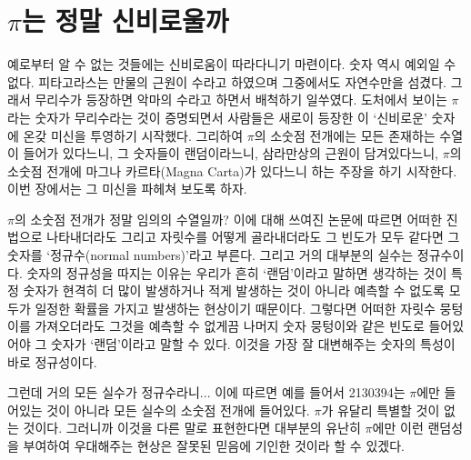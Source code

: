 \documentclass[10pt]{article}
\begin{document}
\section{$\pi$는 정말 신비로울까}
예로부터 알 수 없는 것들에는 신비로움이 따라다니기 마련이다. 숫자 역시 예외일 수 없다. 피타고라스는 만물의 근원이 수라고 하였으며 그중에서도 자연수만을 섬겼다. 그래서 무리수가 등장하면 악마의 수라고 하면서 배척하기 일쑤였다. 도처에서 보이는 $\pi$라는 숫자가 무리수라는 것이 증명되면서 사람들은 새로이 등장한 이 `신비로운' 숫자에 온갖 미신을 투영하기 시작했다. 그리하여 $\pi$의 소숫점 전개에는 모든 존재하는 수열이 들어가 있다느니, 그 숫자들이 랜덤이라느니, 삼라만상의 근원이 담겨있다느니, $\pi$의 소숫점 전개에 마그나 카르타(Magna Carta)가 있다느니 하는 주장을 하기 시작한다. 이번 장에서는 그 미신을 파헤쳐 보도록 하자.\par
$\pi$의 소숫점 전개가 정말 임의의 수열일까? 이에 대해 쓰여진 논문\cite{normalnumbers}에 따르면 어떠한 진법으로 나타내더라도 그리고 자릿수를 어떻게 골라내더라도 그 빈도가 모두 같다면 그 숫자를 `정규수(normal numbers)'라고 부른다. 그리고 거의 대부분의 실수는 정규수이다. 숫자의 정규성을 따지는 이유는 우리가 흔히 `랜덤'이라고 말하면 생각하는 것이 특정 숫자가 현격히 더 많이 발생하거나 적게 발생하는 것이 아니라 예측할 수 없도록 모두가 일정한 확률을 가지고 발생하는 현상이기 때문이다. 그렇다면 어떠한 자릿수 뭉텅이를 가져오더라도 그것을 예측할 수 없게끔 나머지 숫자 뭉텅이와 같은 빈도로 들어있어야 그 숫자가 `랜덤'이라고 말할 수 있다. 이것을 가장 잘 대변해주는 숫자의 특성이 바로 정규성이다.\par
그런데 거의 모든 실수가 정규수라니... 이에 따르면 예를 들어서 2130394는 $\pi$에만 들어있는 것이 아니라 모든 실수의 소숫점 전개에 들어있다. $\pi$가 유달리 특별할 것이 없는 것이다. 그러니까 이것을 다른 말로 표현한다면 대부분의 
유난히 $\pi$에만 이런 랜덤성을 부여하여 우대해주는 현상은 잘못된 믿음에 기인한 것이라 할 수 있겠다.
\end{document}

